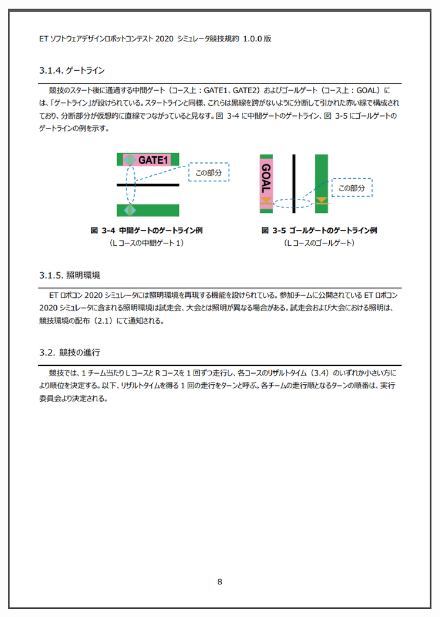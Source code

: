 \documentclass[uplatex, report, a4j, 10pt]{jsbook}
\begin{document}
\begin{figure}[tp]
    \begin{center}
    \includegraphics[width=\hsize]{specification/ET_5.eps}
    \end{center}
\end{figure}
\end{document}
